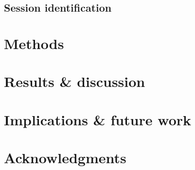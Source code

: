 \documentclass{sig-alternate}
\begin{document}
\subsection{Session identification}
\label{sec:session_identification}


\section{Methods}
\label{sec:methods}


\section{Results \& discussion}
\label{sec:results_and_discussion}


\section{Implications \& future work}
\label{sec:implications_and_future_work}


\section{Acknowledgments}
\label{sec:acknowledgements}





\end{document}
